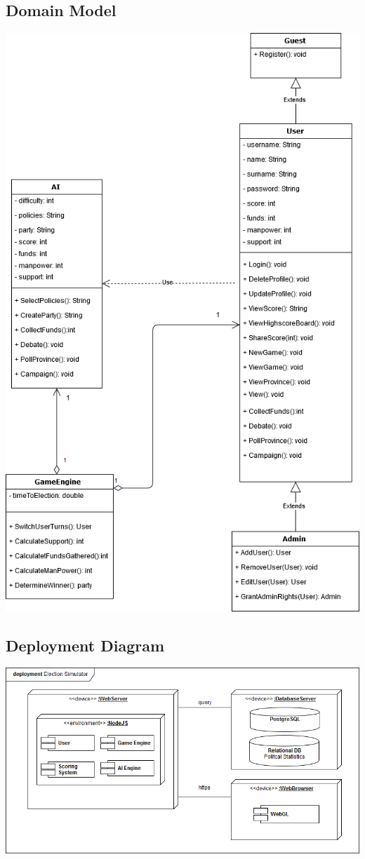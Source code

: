 \documentclass{article}
\begin{document}
		\subsection{Domain Model}
                \includegraphics[width=0.8\linewidth]{Images/OverallSystemClassDiagram.png}
        	\subsection{Deployment Diagram}	
                \includegraphics[width=1\linewidth]{Images/DeploymentDiagram.png}
\end{document}
